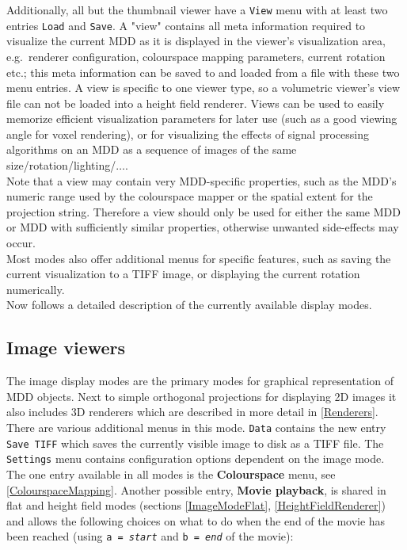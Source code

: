 \documentclass[11pt]{article}
\begin{document}
Additionally, all but the thumbnail viewer have a \texttt{View} menu with at
least two entries \texttt{Load} and \texttt{Save}. A "view" contains all meta
information required to visualize the current MDD as it is displayed in the
viewer's visualization area, e.g.\ renderer configuration, colourspace mapping
parameters, current rotation etc.; this meta information can be saved to and loaded
from a file with these two menu entries. A view is specific to one viewer type,
so a volumetric viewer's view file can not be loaded into a height field renderer.
Views can be used to easily memorize efficient visualization parameters for later
use (such as a good viewing angle for voxel rendering), or for visualizing the
effects of signal processing algorithms on an MDD as a sequence of images of the
same size/rotation/lighting/$\ldots$.\\
Note that a view may contain very MDD-specific properties, such as the
MDD's numeric range used by the colourspace mapper or the spatial extent
for the projection string. Therefore a view should only be used for either
the same MDD or MDD with sufficiently similar properties, otherwise unwanted
side-effects may occur.\\
Most modes also offer additional menus for specific features, such as saving the
current visualization to a TIFF image, or displaying the current rotation
numerically.\\
Now follows a detailed description of the currently available display modes.


\subsection{Image viewers}
\label{ImageDisplayMode}

The image display modes are the primary modes for graphical representation of MDD
objects. Next to simple orthogonal projections for displaying 2D images it also
includes 3D renderers which are described in more detail in \ref{Renderers}.\\
There are various additional menus in this mode. \texttt{Data} contains the new
entry \texttt{Save TIFF} which saves the currently visible image to disk as a TIFF file.
The \texttt{Settings} menu contains configuration options dependent on the image
mode. The one entry available in all modes is the \textbf{Colourspace} menu, see
\ref{ColourspaceMapping}. Another possible entry, \textbf{Movie playback}, is
shared in flat and height field modes (sections \ref{ImageModeFlat},
\ref{HeightFieldRenderer}) and allows the following choices on what to do
when the end of the movie has been reached (using \texttt{a = \textsl{start}} and
\texttt{b = \textsl{end}} of the movie):
\end{document}
